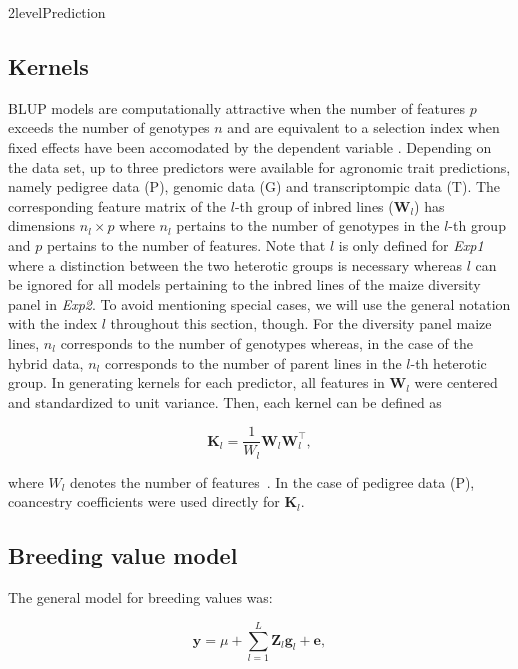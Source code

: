 \documentclass[12pt,titlepage]{article}
\begin{document}
\Genetics2level{Prediction}
\subsection{Kernels}
BLUP models are computationally attractive when the number of features $p$
exceeds the number of genotypes $n$ and are equivalent to a selection index
when fixed effects have been accomodated by the dependent variable 
\cite{Mrode2014}.
Depending on the data set, up to three predictors were available for agronomic
trait predictions, namely pedigree data (P), genomic data (G) and
transcriptompic data (T).
The corresponding feature matrix of the $l$-th group of inbred lines 
($\mathbf{W}_{l}$) has dimensions $n_{l} \times p$ where $n_{l}$ pertains to 
the number of genotypes in the $l$-th group and $p$ pertains to the number of 
features.
Note that $l$ is only defined for \textit{Exp1} where a distinction between 
the two heterotic groups is necessary whereas $l$ can be ignored for all 
models pertaining to the inbred lines of the maize diversity panel in 
\textit{Exp2}.
To avoid mentioning special cases, we will use the general notation with 
the index $l$ throughout this section, though.
For the diversity panel maize lines, $n_{l}$ corresponds to the number of 
genotypes whereas, in the case of the hybrid data, $n_{l}$ corresponds to the 
number of parent lines in the $l$-th heterotic group.
In generating kernels for each predictor, all features in $\mathbf{W}_{l}$ were
centered and standardized to unit variance.
Then, each kernel can be defined as

\begin{equation} \label{eq:GenomicRelationship}
  \mathbf{K}_{l} = \frac{1}{W_{l}} \mathbf{W}_{l} \mathbf{W}_{l}^{\top},
\end{equation}

where $W_{l}$ denotes the number of features~\cite{VanRaden2008}.
In the case of pedigree data (P), coancestry coefficients were used directly
for $\mathbf{K}_{l}$.


\subsection{Breeding value model}
The general model for breeding values was:

\begin{equation} \label{eq:KBLUPModel}
  \mathbf{y} = \mu + 
  \sum_{l=1}^{L} \mathbf{Z}_{l} \mathbf{g}_{l} + \mathbf{e},
\end{equation}
\end{document}
